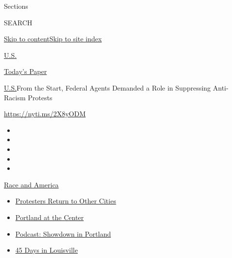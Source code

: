 Sections

SEARCH

\protect\hyperlink{site-content}{Skip to
content}\protect\hyperlink{site-index}{Skip to site index}

\href{https://www.nytimes.com/section/us}{U.S.}

\href{https://myaccount.nytimes.com/auth/login?response_type=cookie\&client_id=vi}{}

\href{https://www.nytimes.com/section/todayspaper}{Today's Paper}

\href{/section/us}{U.S.}\textbar{}From the Start, Federal Agents
Demanded a Role in Suppressing Anti-Racism Protests

\url{https://nyti.ms/2X8yODM}

\begin{itemize}
\item
\item
\item
\item
\item
\end{itemize}

\href{https://www.nytimes.com/news-event/george-floyd-protests-minneapolis-new-york-los-angeles?action=click\&pgtype=Article\&state=default\&region=TOP_BANNER\&context=storylines_menu}{Race
and America}

\begin{itemize}
\tightlist
\item
  \href{https://www.nytimes.com/2020/07/26/us/protests-portland-seattle-trump.html?action=click\&pgtype=Article\&state=default\&region=TOP_BANNER\&context=storylines_menu}{Protesters
  Return to Other Cities}
\item
  \href{https://www.nytimes.com/2020/07/24/us/portland-oregon-protests-white-race.html?action=click\&pgtype=Article\&state=default\&region=TOP_BANNER\&context=storylines_menu}{Portland
  at the Center}
\item
  \href{https://www.nytimes.com/2020/07/23/podcasts/the-daily/portland-protests.html?action=click\&pgtype=Article\&state=default\&region=TOP_BANNER\&context=storylines_menu}{Podcast:
  Showdown in Portland}
\item
  \href{https://www.nytimes.com/interactive/2020/07/16/us/black-lives-matter-protests-louisville-breonna-taylor.html?action=click\&pgtype=Article\&state=default\&region=TOP_BANNER\&context=storylines_menu}{45
  Days in Louisville}
\end{itemize}

